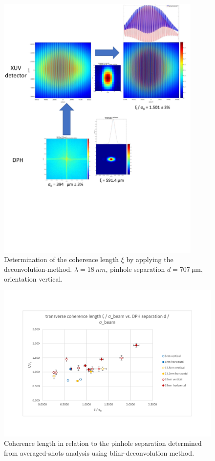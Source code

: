 \documentclass{osa-article}
\begin{document}
\begin{figure}[hbtp]
    \centering
    \includegraphics[width=0.9\textwidth]{gfx/deconvolution_example_18nm_707_ver_S.pdf}
    \caption{Determination of the coherence length $\xi$ by applying the deconvolution-method. $\lambda=\SI{18}{nm}$, pinhole separation $d=\SI{707}{\micro\meter}$, orientation vertical.}
    \label{fig:deconvolution_example_18nm_707_ver_S}
\end{figure}


\begin{figure}[hbtp]
    \centering
    \includegraphics[width=1\textwidth]{gfx/DPH_results_coherence_vs_separation.pdf}
    \caption{Coherence length in relation to the pinhole separation determined from averaged-shots analysis using blinr-deconvolution method.}
    \label{fig:DPH_results_coherence_vs_separation}
\end{figure}
\end{document}
